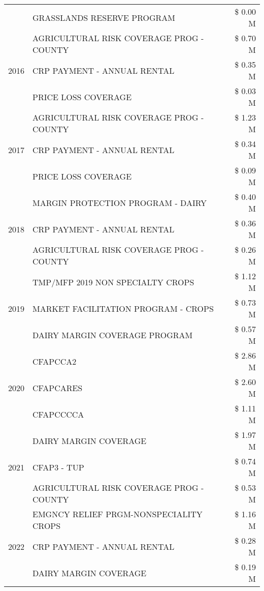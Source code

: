 \begin{tabular}{llr}
 & GRASSLANDS RESERVE PROGRAM & \$ 0.00 M \\
\cline{1-3}
\multirow[t]{3}{*}{2016} & AGRICULTURAL RISK COVERAGE PROG - COUNTY & \$ 0.70 M \\
 & CRP PAYMENT - ANNUAL RENTAL & \$ 0.35 M \\
 & PRICE LOSS COVERAGE & \$ 0.03 M \\
\cline{1-3}
\multirow[t]{3}{*}{2017} & AGRICULTURAL RISK COVERAGE PROG - COUNTY & \$ 1.23 M \\
 & CRP PAYMENT - ANNUAL RENTAL & \$ 0.34 M \\
 & PRICE LOSS COVERAGE & \$ 0.09 M \\
\cline{1-3}
\multirow[t]{3}{*}{2018} & MARGIN PROTECTION PROGRAM - DAIRY & \$ 0.40 M \\
 & CRP PAYMENT - ANNUAL RENTAL & \$ 0.36 M \\
 & AGRICULTURAL RISK COVERAGE PROG - COUNTY & \$ 0.26 M \\
\cline{1-3}
\multirow[t]{3}{*}{2019} & TMP/MFP 2019 NON SPECIALTY CROPS & \$ 1.12 M \\
 & MARKET FACILITATION PROGRAM - CROPS & \$ 0.73 M \\
 & DAIRY MARGIN COVERAGE PROGRAM & \$ 0.57 M \\
\cline{1-3}
\multirow[t]{3}{*}{2020} & CFAPCCA2 & \$ 2.86 M \\
 & CFAPCARES & \$ 2.60 M \\
 & CFAPCCCCA & \$ 1.11 M \\
\cline{1-3}
\multirow[t]{3}{*}{2021} & DAIRY MARGIN COVERAGE & \$ 1.97 M \\
 & CFAP3 - TUP & \$ 0.74 M \\
 & AGRICULTURAL RISK COVERAGE PROG - COUNTY & \$ 0.53 M \\
\cline{1-3}
\multirow[t]{3}{*}{2022} & EMGNCY RELIEF PRGM-NONSPECIALITY CROPS & \$ 1.16 M \\
 & CRP PAYMENT - ANNUAL RENTAL & \$ 0.28 M \\
 & DAIRY MARGIN COVERAGE & \$ 0.19 M \\
\cline{1-3}
\bottomrule
\end{tabular}
